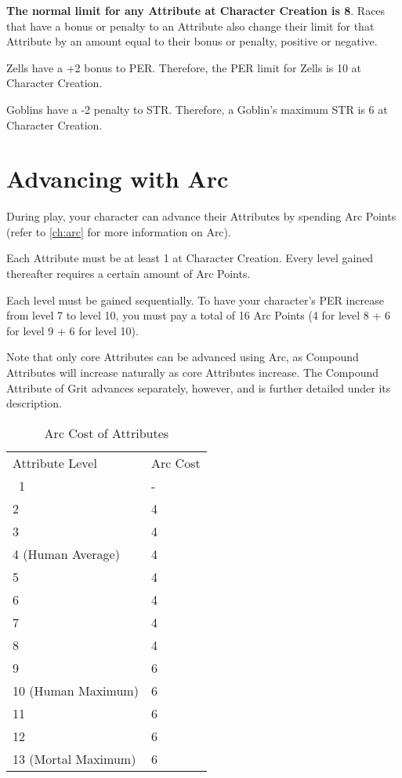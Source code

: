 \documentclass[oneside,11pt,english]{book}
\begin{document}
\textbf{The normal limit for any Attribute at Character Creation is 8}. Races that have a bonus or penalty to an 
Attribute also change their limit for that Attribute by an amount equal to their bonus or penalty, positive 
or negative. 

Zells have a +2 bonus to PER. Therefore, the PER limit for Zells is 10 at Character Creation. 

Goblins have a -2 penalty to STR. Therefore, a Goblin’s maximum STR is 6 at Character Creation.
\section{Advancing with Arc}
During play, your character can advance their Attributes by spending Arc Points (refer to \autoref{ch:arc} for 
more information on Arc). 
 

Each Attribute must be at least 1 at Character Creation. Every level gained thereafter requires a certain 
amount of Arc Points. 

 
Each level must be gained sequentially. To have your character’s PER increase from level 7 to level 10, 
you must pay a total of 16 Arc Points (4 for level 8 + 6 for level 9 + 6 for level 10). 
 

Note that only core Attributes can be advanced using Arc, as Compound Attributes will increase naturally 
as core Attributes increase. The Compound Attribute of Grit advances separately, however, and is further 
detailed under its description. 
\begin{table}
	\centering
	\caption{Arc Cost of Attributes}
	\label{tab:AttribsArcCost}
\begin{tabu} spread 0pt {Xl}
Attribute Level & Arc Cost\\\
1& -                        \\
2& 4                        \\
3& 4                        \\
4 (Human Average)& 4        \\
5& 4                        \\
6& 4                        \\
7& 4                        \\
8& 4                        \\
9& 6                        \\
10 (Human Maximum)& 6       \\
11& 6                       \\
12& 6                       \\
13 (Mortal Maximum)& 6      \\
\end{tabu}
\end{table}
\end{document}
